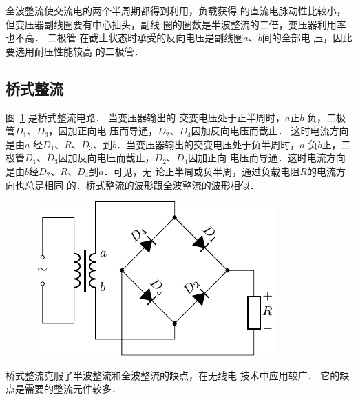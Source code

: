 全波整流使交流电的两个半周期都得到利用，负载获得
的直流电脉动性比较小，但变压器副线圈要有中心抽头，副线
圈的圈数是半波整流的二倍，变压器利用率也不高．
二极管
在截止状态时承受的反向电压是副线圈$a$、$b$间的全部电
压，因此要选用耐压性能较高
的二极管．

\subsection{桥式整流}


图~\ref{fig_C_3-35} 是桥式整流电路．
当变压器输出的
交变电压处于正半周时，$a$正$b$
负，二极管$D_1$、$D_3$，因加正向电
压而导通，$D_2$、$D_4$因加反向电压而截止．
这时电流方向是由$a$
经$D_1$、$R$、$D_3$、到$b$．当变压器输出的交变电压处于负半周时，$a$
负$b$正，二极管$D_1$、$D_3$因加反向电压而截止，$D_2$、$D_4$因加正向
电压而导通．这时电流方向是由$b$经$D_2$、$R$、$D_4$到$a$．可见，无
论正半周或负半周，通过负载电阻$R$的电流方向也总是相同
的．桥式整流的波形跟全波整流的波形相似．

\begin{figure}[htbp]
	\centering
	\includegraphics{fig/C/3-35.pdf}
	\caption{}\label{fig_C_3-35}
\end{figure}


桥式整流克服了半波整流和全波整流的缺点，在无线电
技术中应用较广．
它的缺点是需要的整流元件较多．


